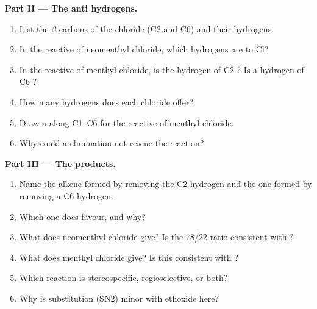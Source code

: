 \begin{problem}
\medskip
\noindent\textbf{Part II --- The anti hydrogens.}
\begin{enumerate}[resume]
  \item List the $\beta$ carbons of the chloride (C2 and C6) and their
        hydrogens.
  \item In the reactive  of neomenthyl chloride, which hydrogens are
         to Cl?
  \item In the reactive  of menthyl chloride, is the hydrogen of C2
        ? Is a hydrogen of C6 ?
  \item How many  hydrogens does each chloride offer?
  \item Draw a  along C1--C6 for the reactive  of
        menthyl chloride.
  \item Why could a  elimination not rescue the
        reaction?
\end{enumerate}

\medskip
\noindent\textbf{Part III --- The products.}
\begin{enumerate}[resume]
  \item Name the alkene formed by removing the C2 hydrogen and the one
        formed by removing a C6 hydrogen.
  \item Which one does  favour, and why?
  \item What does neomenthyl chloride give? Is the 78/22 ratio consistent
        with ?
  \item What does menthyl chloride give? Is this consistent with
        ?
  \item Which reaction is stereospecific, regioselective, or both?
  \item Why is substitution (SN2) minor with ethoxide here?
\end{enumerate}


\end{problem}

